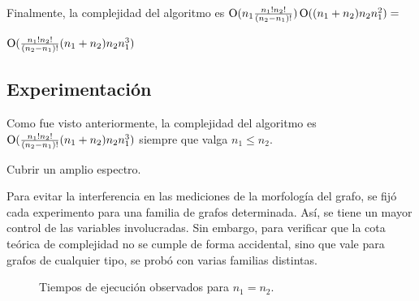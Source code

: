 Finalmente, la complejidad del algoritmo es
$\operatorname{O}(n_1  \frac{n_1!  n_2!}{(n_2 - n_1)!}) \operatorname{O}((n_1 + n_2)  n_2  n_1^2)=$

\begin{center}
$\operatorname{O}(\frac{n_1!  n_2!}{(n_2 - n_1)!} (n_1 + n_2)  n_2  n_1^3)$
\end{center}

\subsection{Experimentación}

Como fue visto anteriormente, la complejidad del algoritmo es
$\operatorname{O}(\frac{n_1!  n_2!}{(n_2 - n_1)!} (n_1 + n_2)  n_2  n_1^3)$ siempre que
valga $n_1 \leq n_2$.

Cubrir un amplio espectro.

Para evitar la interferencia en las mediciones de la morfología del grafo, se
fijó cada experimento para una familia de grafos determinada. Así, se tiene un
mayor control de las variables involucradas. Sin embargo, para verificar que
la cota teórica de complejidad no se cumple de forma accidental, sino que vale
para grafos de cualquier tipo, se probó con varias familias distintas.

\begin{figure}[H]
    \label{fig:exp2:n_1=n_2}
    \centering
    \caption{Tiempos de ejecución observados para $n_1 = n_2$.}
\end{figure}